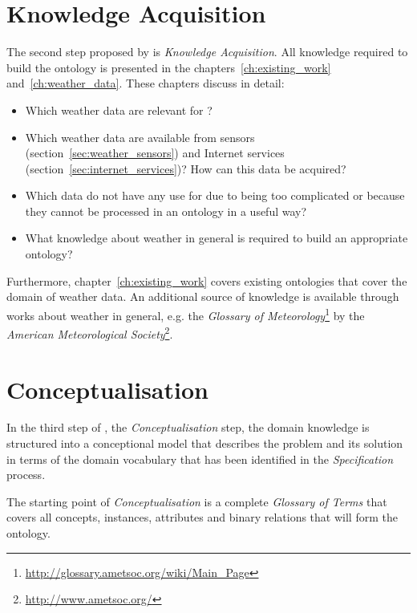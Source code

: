 \section{Knowledge Acquisition}

The second step proposed by \methontology is \emph{Knowledge Acquisition}. All knowledge required to build the \thinkhomeweather ontology is presented in the chapters~\ref{ch:existing_work} and~\ref{ch:weather_data}. These chapters discuss in detail:

\begin{itemize}
  \item Which weather data are relevant for \thinkhome?
  \item Which weather data are available from sensors (section~\ref{sec:weather_sensors}) and Internet services (section~\ref{sec:internet_services})? How can this data be acquired?
  \item Which data do not have any use for \thinkhomeweather due to being too complicated or because they cannot be processed in an ontology in a useful way?
  \item What knowledge about weather in general is required to build an appropriate ontology? %
\end{itemize}

Furthermore, chapter~\ref{ch:existing_work} covers existing ontologies that cover the domain of weather data. An additional source of knowledge is available through works about weather in general, e.g. the \emph{Glossary of Meteorology}\footnote{\href{http://glossary.ametsoc.org/wiki/Main\_Page}{http://glossary.ametsoc.org/wiki/Main\_Page}} by the \emph{American Meteorological Society}\footnote{\href{http://www.ametsoc.org/}{http://www.ametsoc.org/}}\cite{GlossaryOfMeteorology}.

\section{Conceptualisation}

In the third step of \methontology, the \emph{Conceptualisation} step, the domain knowledge is structured into a conceptional model that describes the problem and its solution in terms of the domain vocabulary that has been identified in the \emph{Specification} process.

The starting point of \emph{Conceptualisation} is a complete \emph{Glossary of Terms} that covers all concepts, instances, attributes and binary relations that will form the ontology.

